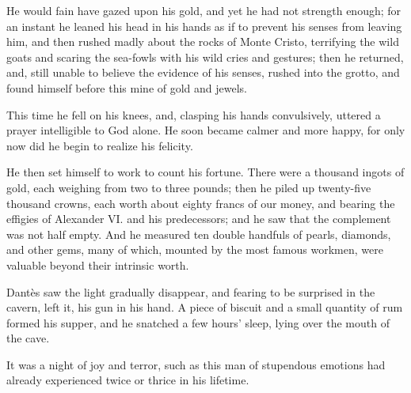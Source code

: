 He would fain have gazed upon his gold, and yet he had not strength
enough; for an instant he leaned his head in his hands as if to prevent
his senses from leaving him, and then rushed madly about the rocks of
Monte Cristo, terrifying the wild goats and scaring the sea-fowls with
his wild cries and gestures; then he returned, and, still unable to
believe the evidence of his senses, rushed into the grotto, and found
himself before this mine of gold and jewels.

This time he fell on his knees, and, clasping his hands convulsively,
uttered a prayer intelligible to God alone. He soon became calmer and
more happy, for only now did he begin to realize his felicity.

He then set himself to work to count his fortune. There were a thousand
ingots of gold, each weighing from two to three pounds; then he piled
up twenty-five thousand crowns, each worth about eighty francs of our
money, and bearing the effigies of Alexander VI. and his predecessors;
and he saw that the complement was not half empty. And he measured ten
double handfuls of pearls, diamonds, and other gems, many of which,
mounted by the most famous workmen, were valuable beyond their
intrinsic worth.

Dantès saw the light gradually disappear, and fearing to be surprised
in the cavern, left it, his gun in his hand. A piece of biscuit and a
small quantity of rum formed his supper, and he snatched a few hours’
sleep, lying over the mouth of the cave.

It was a night of joy and terror, such as this man of stupendous
emotions had already experienced twice or thrice in his lifetime.

